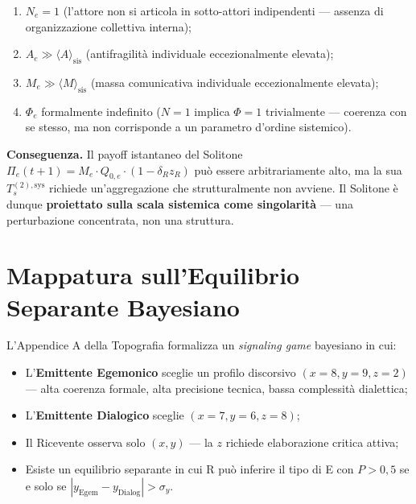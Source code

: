 \begin{enumerate}
\def\labelenumi{\arabic{enumi}.}
\tightlist
\item
  \(N_e = 1\) (l'attore non si articola in sotto-attori indipendenti ---
  assenza di organizzazione collettiva interna);
\item
  \(A_e \gg \langle A \rangle_{\text{sis}}\) (antifragilità individuale
  eccezionalmente elevata);
\item
  \(M_e \gg \langle M \rangle_{\text{sis}}\) (massa comunicativa
  individuale eccezionalmente elevata);
\item
  \(\Phi_e\) formalmente indefinito (\(N=1\) implica \(\Phi = 1\)
  trivialmente --- coerenza con se stesso, ma non corrisponde a un
  parametro d'ordine sistemico).
\end{enumerate}

\Proved{} \textbf{Conseguenza.} Il payoff istantaneo del Solitone
\(\Pi_e(t+1) = M_e \cdot Q_{0,e} \cdot (1 - \delta_R z_R)\) può essere
arbitrariamente alto, ma la sua \(T_s^{(2),\text{sys}}\) richiede
un'aggregazione che strutturalmente non avviene. Il Solitone è dunque
\textbf{proiettato sulla scala sistemica come singolarità} --- una
perturbazione concentrata, non una struttura.



\section{Mappatura sull'Equilibrio Separante
Bayesiano}\label{mappatura-sullequilibrio-separante-bayesiano}

L'Appendice A della Topografia formalizza un \emph{signaling game}
bayesiano in cui:

\begin{itemize}
\tightlist
\item
  L'\textbf{Emittente Egemonico} sceglie un profilo discorsivo
  \((x = 8, y = 9, z = 2)\) --- alta coerenza formale, alta precisione
  tecnica, bassa complessità dialettica;
\item
  L'\textbf{Emittente Dialogico} sceglie \((x = 7, y = 6, z = 8)\);
\item
  Il Ricevente osserva solo \((x, y)\) --- la \(z\) richiede
  elaborazione critica attiva;
\item
  Esiste un equilibrio separante in cui R può inferire il tipo di E con
  \(P > 0{,}5\) se e solo se
  \(|y_{\text{Egem}} - y_{\text{Dialog}}| > \sigma_y\).
\end{itemize}

